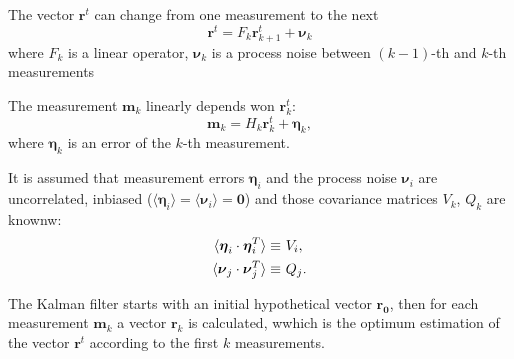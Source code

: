 \documentclass[a4paper]{book}
\let\vec\mathbf  %
\begin{document}
The vector $\vec{r}^t$ can change from one measurement to the next
\begin{equation}
\vec{r}^t = F_k \vec{r}^t_{k+1} + \boldsymbol\nu_k 
\label{eq:rtk}
\end{equation}
where $F_k$ is a linear operator, $\boldsymbol\nu_k$ is a process noise between $(k -1)$-th and $k$-th measurements

The measurement $\vec{m}_k$ linearly depends won $\vec{r}^t_k$:
\begin{equation}
\vec{m}_k = H_k \vec{r}^t_k + \boldsymbol\eta_k,
\label{eq:mk}
\end{equation}
where $\boldsymbol\eta_k$ is an error of the $k$-th measurement.

It is assumed that measurement errors $\boldsymbol\eta_i$ and the process noise $\boldsymbol\nu_i$ are uncorrelated, inbiased ($\langle \boldsymbol\eta_i \rangle = \langle \boldsymbol\nu_i \rangle   = \vec{0} $) and those covariance matrices $V_k$, $Q_k$ are knownw:
\begin{align}
\notag
\langle \boldsymbol\eta_i \cdot \boldsymbol\eta_i^T \rangle \equiv &\ V_i, \\
\langle \boldsymbol\nu_j \cdot \boldsymbol\nu_j^T \rangle \equiv &\ Q_j.
\label{eq:VQ}
\end{align}

The Kalman filter starts with an initial hypothetical vector $\vec{r_0}$, then for each measurement $\vec{m}_k$ a vector $\vec{r}_k$ is calculated, wwhich is the optimum estimation of the vector $\vec{r}^t$ according to the first $k$ measurements.
\end{document}
